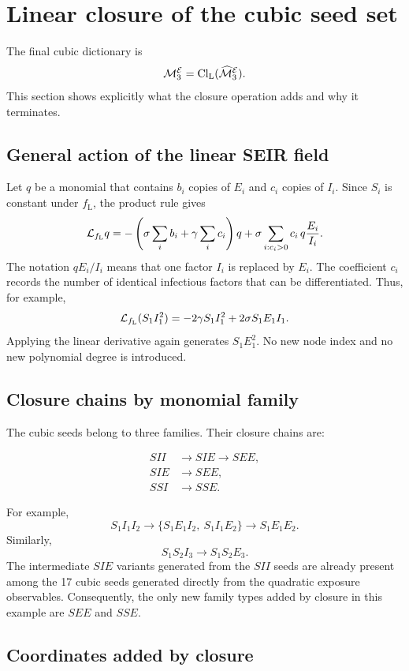 \section{Linear closure of the cubic seed set}
\label{sec:linear_closure}

The final cubic dictionary is
\[
\mathcal M_3^{\mathcal{E}}
=
\operatorname{Cl}_{\mathrm L}(\widehat{\mathcal M}_3^{\mathcal{E}}).
\]
This section shows explicitly what the closure operation adds and why it
terminates.

\subsection{General action of the linear SEIR field}

Let $q$ be a monomial that contains $b_i$ copies of $E_i$ and $c_i$ copies of
$I_i$. Since $S_i$ is constant under $f_{\mathrm L}$, the product rule gives
\[
\mathcal{L}_{f_{\mathrm L}} q
=
-\left(\sigma\sum_i b_i+\gamma\sum_i c_i\right)q
+
\sigma\sum_{i:c_i>0}
 c_i\,q\frac{E_i}{I_i}.
\]
The notation $qE_i/I_i$ means that one factor $I_i$ is replaced by $E_i$.
The coefficient $c_i$ records the number of identical infectious factors that
can be differentiated. Thus, for example,
\[
\mathcal{L}_{f_{\mathrm L}}(S_1I_1^2)
=-2\gamma S_1I_1^2+2\sigma S_1E_1I_1.
\]
Applying the linear derivative again generates $S_1E_1^2$. No new node index
and no new polynomial degree is introduced.

\subsection{Closure chains by monomial family}

The cubic seeds belong to three families. Their closure chains are:

\begin{align*}
SII
&\longrightarrow SIE\longrightarrow SEE,\\
SIE
&\longrightarrow SEE,\\
SSI
&\longrightarrow SSE.
\end{align*}

For example,
\[
S_1I_1I_2
\longrightarrow
\{S_1E_1I_2,\ S_1I_1E_2\}
\longrightarrow
S_1E_1E_2.
\]
Similarly,
\[
S_1S_2I_3\longrightarrow S_1S_2E_3.
\]
The intermediate $SIE$ variants generated from the $SII$ seeds are already
present among the 17 cubic seeds generated directly from the quadratic
exposure observables. Consequently, the only new family types added by closure
in this example are $SEE$ and $SSE$.

\subsection{Coordinates added by closure}

